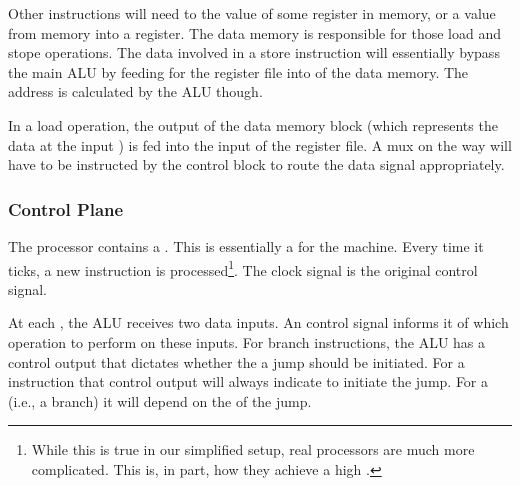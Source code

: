 Other instructions will need to  the value of some register in memory, or  a value from memory into a register. The data memory is responsible for those load and stope operations. The data involved in a store instruction will essentially bypass the main ALU by feeding  for the register file into  of the data memory. The address is calculated by the ALU though.

In a load operation, the  output of the data memory block (which represents the data at the input ) is fed into the  input of the register file. A mux on the way will have to be instructed by the control block to route the data signal appropriately.


\subsubsection{Control Plane}
\label{sec:bg:machine:control_plane}

The processor contains a . This is essentially a  for the machine. Every time it ticks, a new instruction is processed\footnote{While this is true in our simplified setup, real processors are much more complicated. This is, in part, how they achieve a high .}. The clock signal is the original control signal.

At each , the ALU receives two data inputs. An  control signal informs it of which operation to perform on these inputs. For branch instructions, the ALU has a control output that dictates whether the a jump should be initiated. For a  instruction that control output will always indicate to initiate the jump. For a  (i.e., a branch) it will depend on the  of the jump.

